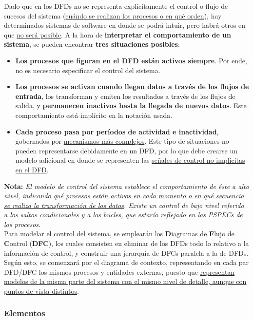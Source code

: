 Dado que en los DFDs no se representa explícitamente el control o flujo de sucesos del sistema (\uline{cuándo se realizan los procesos o en qué orden}), hay determinados sistemas de software en donde se podrá intuir, pero habrá otros en que \uline{no será posible}. A la hora de \textbf{interpretar el comportamiento de un sistema}, se pueden encontrar \textbf{tres situaciones posibles}:

\begin{itemize}
    \item \textbf{Los procesos que figuran en el DFD están activos siempre}. Por ende, no es necesario especificar el control del sistema.
    \item \textbf{Los procesos se activan cuando llegan datos a través de los flujos de entrada}, los transforman y emiten los resultados a través de los flujos de salida, y \textbf{permanecen inactivos hasta la llegada de nuevos datos}. Este comportamiento está implícito en la notación usada.
    \item \textbf{Cada proceso pasa por períodos de actividad e inactividad}, gobernados por \uline{mecanismos más complejos}. Este tipo de situaciones no pueden representarse debidamente en un DFD, por lo que debe crearse un modelo adicional en donde se representen las \uline{señales de control no implícitas en el DFD}.
\end{itemize}

\textbf{Nota:} \textit{El modelo de control del sistema establece el comportamiento de éste a alto nivel, indicando \uline{qué procesos están activos en cada momento o en qué secuencia se realiza la transformación de los datos}. Existe un control de bajo nivel referido a los saltos condicionales y a los bucles, que estaría reflejado en las PSPECs de los procesos.}\\

Para modelar el control del sistema, se emplearán los \textbf{D}iagramas de \textbf{F}lujo de \textbf{C}ontrol (\textbf{DFC}), los cuales consisten en eliminar de los DFDs todo lo relativo a la información de control, y construir una jerarquía de DFCs paralela a la de DFDs. Según esto, se comenzará por el diagrama de contexto, representando en cada par DFD/DFC los mismos procesos y entidades externas, puesto que \uline{representan modelos de la misma parte del sistema con el mismo nivel de detalle, aunque con puntos de vista distintos}.\\

\subsubsection{Elementos}

